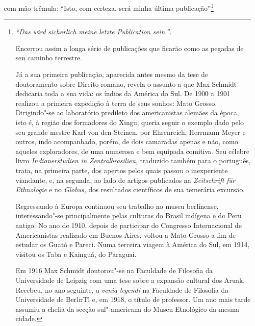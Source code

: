 com mão trêmula: ``Isto, com certeza, será minha última publicação''\footnote{\textit{``Das wird sicherlich meine letzte Publication sein.''}.

Encerrou assim a longa série de publicações que ficarão como as pegadas
de seu caminho terrestre.


Já a sua primeira publicação, aparecida antes mesmo da tese de
doutoramento sobre Direito romano, revela o assunto a que Max Schmidt
dedicaria toda a sua vida: os índios da América do Sul. De 1900 a 1901
realizou a primeira expedição à terra de seus sonhos: Mato Grosso.
Dirigindo"-se ao laboratório predileto dos americanistas alemães da
época, isto é, à região dos formadores do Xingu, queria seguir o exemplo
dado pelo seu grande mestre Karl von den Steinen, por Ehrenreich,
Herrmann Meyer e outros, indo acompanhado, porém, de dois camaradas
apenas e não, como aqueles exploradores, de uma numerosa e bem equipada
comitiva. Seu célebre livro \textit{Indianerstudien in Zentralbrasilien,}
traduzido também para o português, trata, na primeira parte, dos apertos
pelos quais passou o inexperiente viandante, e, na segunda, ao lado de
artigos publicados na \textit{Zeitschrift für Ethnologie} e no
\textit{Globus,} dos resultados científicos de sua temerária excursão.

Regressando à Europa continuou seu trabalho no museu berlinense,
interessando"-se principalmente pelas culturas do Brasil indígena e do
Peru antigo. No ano de 1910, depois de participar do Congresso
Internacional de Americanistas realizado em Buenos Aires, voltou a Mato
Grosso a fim de estudar os Guató e Pareci. Numa terceira viagem à
América do Sul, em 1914, visitou os Taba e Kainguá, do Paraguai.

Em 1916 Max Schmidt doutorou"-se na Faculdade de Filosofia da
Universidade de Leipzig com uma tese sobre a expansão cultural dos
Aruak. Recebeu, no ano seguinte, a \textit{venia legendi} na Faculdade de
Filosofia da Universidade de BerlirTl e, em 1918, o título de professor.
Um ano mais tarde assumiu a chefia da secção sul"-americana do Museu
Etnológico da mesma cidade.

}
